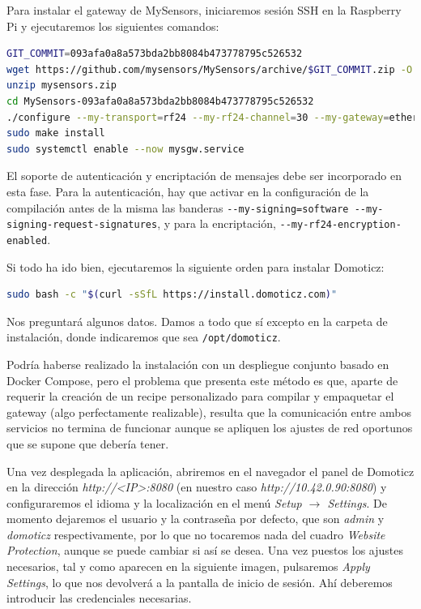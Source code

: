 Para instalar el gateway de MySensors, iniciaremos sesión SSH en la Raspberry
Pi y ejecutaremos los siguientes comandos:

\begin{lstlisting}[language=sh]
GIT_COMMIT=093afa0a8a573bda2bb8084b473778795c526532
wget https://github.com/mysensors/MySensors/archive/$GIT_COMMIT.zip -O mysensors.zip
unzip mysensors.zip
cd MySensors-093afa0a8a573bda2bb8084b473778795c526532
./configure --my-transport=rf24 --my-rf24-channel=30 --my-gateway=ethernet --my-port=5003
sudo make install
sudo systemctl enable --now mysgw.service
\end{lstlisting}

El soporte de autenticación y encriptación de mensajes debe ser incorporado en
esta fase. Para la autenticación, hay que activar en la configuración de la
compilación antes de la misma las banderas
\verb|--my-signing=software --my-signing-request-signatures|, y para la
encriptación, \verb|--my-rf24-encryption-enabled|.

Si todo ha ido bien, ejecutaremos la siguiente orden para instalar Domoticz:

\begin{lstlisting}[language=sh]
sudo bash -c "$(curl -sSfL https://install.domoticz.com)"
\end{lstlisting}

Nos preguntará algunos datos. Damos a todo que sí excepto en la carpeta de
instalación, donde indicaremos que sea \verb|/opt/domoticz|.

Podría haberse realizado la instalación con un despliegue conjunto basado en
Docker Compose, pero el problema que presenta este método es que, aparte de
requerir la creación de un recipe personalizado para compilar y empaquetar el
gateway (algo perfectamente realizable), resulta que la comunicación entre
ambos servicios no termina de funcionar aunque se apliquen los ajustes de red
oportunos que se supone que debería tener.

Una vez desplegada la aplicación, abriremos en el navegador el panel de
Domoticz en la dirección \emph{http://<IP>:8080} (en nuestro caso
\emph{http://10.42.0.90:8080}) y configuraremos el idioma y la localización en
el menú \emph{Setup $\rightarrow$ Settings}. De momento dejaremos el usuario y
la contraseña por defecto, que son \emph{admin} y \emph{domoticz}
respectivamente, por lo que no tocaremos nada del cuadro
\emph{Website Protection}, aunque se puede cambiar si así se desea. Una vez
puestos los ajustes necesarios, tal y como aparecen en la siguiente imagen,
pulsaremos \emph{Apply Settings}, lo que nos devolverá a la pantalla de inicio
de sesión. Ahí deberemos introducir las credenciales necesarias.

